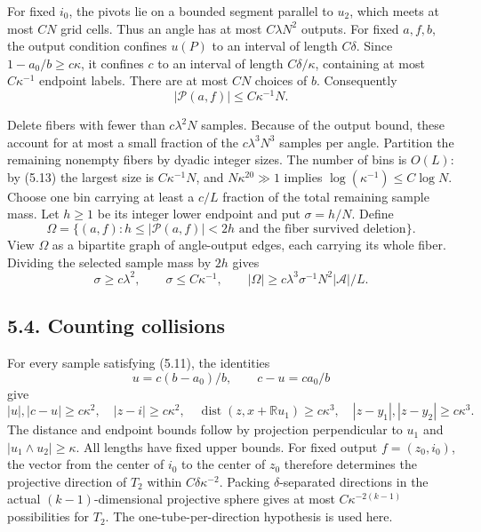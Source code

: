 \documentclass[
  11pt,
  a4paper,
]{article}
\begin{document}
For fixed \(i_0\), the pivots lie on a bounded segment parallel to
\(u_2\), which meets at most \(CN\) grid cells. Thus an angle has at
most \(C\lambda N^2\) outputs. For fixed \(a,f,b\), the output condition
confines \(u(P)\) to an interval of length \(C\delta\). Since
\(1-a_0/b\ge c\kappa\), it confines \(c\) to an interval of length
\(C\delta/\kappa\), containing at most \(C\kappa^{-1}\) endpoint labels.
There are at most \(CN\) choices of \(b\). Consequently \[
 |\mathcal P(a,f)|\le C\kappa^{-1}N.              \tag{5.13}\label{eq:5.13}
\]

Delete fibers with fewer than \(c\lambda^2N\) samples. Because of the
output bound, these account for at most a small fraction of the
\(c\lambda^3N^3\) samples per angle. Partition the remaining nonempty
fibers by dyadic integer sizes. The number of bins is \(O(L)\): by
(5.13) the largest size is \(C\kappa^{-1}N\), and \(N\kappa^{20}\gg1\)
implies \(\log(\kappa^{-1})\le C\log N\). Choose one bin carrying at
least a \(c/L\) fraction of the total remaining sample mass. Let
\(h\ge1\) be its integer lower endpoint and put \(\sigma=h/N\). Define
\[
 \Omega=\{(a,f):h\le|\mathcal P(a,f)|<2h
             \text{ and the fiber survived deletion}\}.
\] View \(\Omega\) as a bipartite graph of angle-output edges, each
carrying its whole fiber. Dividing the selected sample mass by \(2h\)
gives \[
 \sigma\ge c\lambda^2,\qquad \sigma\le C\kappa^{-1},
 \qquad
 |\Omega|\ge c\lambda^3\sigma^{-1}N^2
                    |\mathcal A|/L.             \tag{5.14}\label{eq:5.14}
\]

\hypertarget{counting-collisions}{%
\subsection{5.4. Counting collisions}\label{counting-collisions}}

For every sample satisfying (5.11), the identities \[
 u=c(b-a_0)/b,\qquad c-u=ca_0/b
\] give \[
 |u|,|c-u|\ge c\kappa^2,
 \quad |z-i|\ge c\kappa^2,
 \quad \operatorname{dist}(z,x+\mathbb Ru_1)\ge c\kappa^3,
 \quad |z-y_1|,|z-y_2|\ge c\kappa^3.              \tag{5.15}\label{eq:5.15}
\] The distance and endpoint bounds follow by projection perpendicular
to \(u_1\) and \(|u_1\wedge u_2|\ge\kappa\). All lengths have fixed
upper bounds. For fixed output \(f=(z_0,i_0)\), the vector from the
center of \(i_0\) to the center of \(z_0\) therefore determines the
projective direction of \(T_2\) within \(C\delta\kappa^{-2}\). Packing
\(\delta\)-separated directions in the actual \((k-1)\)-dimensional
projective sphere gives at most \(C\kappa^{-2(k-1)}\) possibilities for
\(T_2\). The one-tube-per-direction hypothesis is used here.
\end{document}
